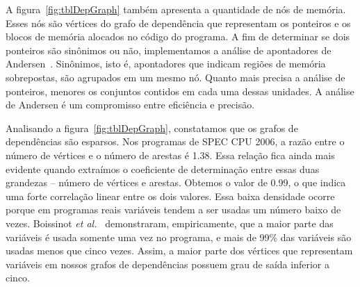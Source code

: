 \documentclass{llncs}
\begin{document}
A figura~\ref{fig:tblDepGraph} também apresenta a quantidade de nós de memória.
Esses nós são vértices do grafo de dependência que representam os ponteiros
e os blocos de memória alocados no código do programa.
A fim de determinar se dois ponteiros são sinônimos ou não, implementamos
a análise de apontadores de Andersen~\cite{Andersen94}.
Sinônimos, isto é, apontadores que indicam regiões de memória sobrepostas, são
agrupados em um mesmo nó.
Quanto mais precisa a análise de ponteiros, menores os conjuntos contidos em
cada uma dessas unidades.
A análise de Andersen é um compromisso entre eficiência e precisão.

Analisando a figura~\ref{fig:tblDepGraph}, constatamos que os grafos de
dependências são esparsos.
Nos programas de SPEC CPU 2006, a razão entre o número de vértices e o número
de arestas é 1.38.
Essa relação fica ainda mais evidente quando extraímos o coeficiente de
determinação entre essas duas grandezas -- número de vértices e arestas.
Obtemos o valor de 0.99, o que indica uma forte correlação linear entre os
dois valores.
Essa baixa densidade ocorre porque em programas reais variáveis tendem a ser
usadas um número baixo de vezes.
Boissinot {\em et al.}~\cite{Benoit08} demonstraram, empiricamente, que
a maior parte das variáveis é usada somente uma vez no programa, e mais de
99\% das variáveis são usadas menos que cinco vezes.
Assim, a maior parte dos vértices que representam variáveis em nossos grafos de
dependências possuem grau de saída inferior a cinco.
\end{document}
